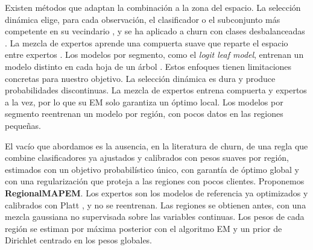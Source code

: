 \documentclass[11pt,a4paper]{article}
\begin{document}
Existen métodos que adaptan la combinación a la zona del espacio. La selección dinámica elige, para cada observación, el clasificador o el subconjunto más competente en su vecindario \cite{woods1997,ko2008}, y se ha aplicado a churn con clases desbalanceadas \cite{xiao2012}. La mezcla de expertos aprende una compuerta suave que reparte el espacio entre expertos \cite{jacobs1991,jordan1994}. Los modelos por segmento, como el \emph{logit leaf model}, entrenan un modelo distinto en cada hoja de un árbol \cite{decaigny2018}. Estos enfoques tienen limitaciones concretas para nuestro objetivo. La selección dinámica es dura y produce probabilidades discontinuas. La mezcla de expertos entrena compuerta y expertos a la vez, por lo que su EM solo garantiza un óptimo local. Los modelos por segmento reentrenan un modelo por región, con pocos datos en las regiones pequeñas.

El vacío que abordamos es la ausencia, en la literatura de churn, de una regla que combine clasificadores ya ajustados y calibrados con pesos suaves por región, estimados con un objetivo probabilístico único, con garantía de óptimo global y con una regularización que proteja a las regiones con pocos clientes. Proponemos \textbf{RegionalMAPEM}. Los expertos son los modelos de referencia ya optimizados y calibrados con Platt \cite{platt1999}, y no se reentrenan. Las regiones se obtienen antes, con una mezcla gaussiana no supervisada sobre las variables continuas. Los pesos de cada región se estiman por máxima posterior con el algoritmo EM \cite{dempster1977} y un prior de Dirichlet centrado en los pesos globales.
\end{document}
